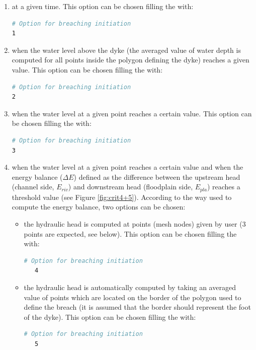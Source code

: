 \begin{enumerate}
\item at a given time. This option can be chosen filling the
 with:
\begin{lstlisting}[language=bash]
# Option for breaching initiation
1
\end{lstlisting}

\item when the water level above the dyke
(the averaged value of water depth is computed for all points inside the
polygon defining the dyke) reaches a given value.
This option can be chosen filling the  with:
\begin{lstlisting}[language=bash]
# Option for breaching initiation
2
\end{lstlisting}

\item when the water level at a given point reaches a certain value.
This option can be chosen filling the  with:
\begin{lstlisting}[language=bash]
# Option for breaching initiation
3
\end{lstlisting}

\item when the water level at a given point reaches a certain value and when
the energy balance ($\Delta E$) defined as the difference between the upstream
head (channel side, $E_{riv}$) and downstream head (floodplain side, $E_{pla}$)
reaches a threshold value (see Figure \ref{fig:crit4+5}).
According to the way used to compute the energy balance, two options can be chosen:
\begin{itemize}
 \item the hydraulic head is computed at points (mesh nodes) given by user (3
   points are expected, see below).
   This option can be chosen filling the  with:
   \begin{lstlisting}[language=bash]
   # Option for breaching initiation
   4
   \end{lstlisting}
 \item the hydraulic head is automatically computed by  taking an
   averaged value of points which are located on the border of the polygon
   used to define the breach
   (it is assumed that the border should represent the foot of the dyke).
   This option can be chosen filling the  with:
   \begin{lstlisting}[language=bash]
   # Option for breaching initiation
   5
   \end{lstlisting}
\end{itemize}
\end{enumerate}
